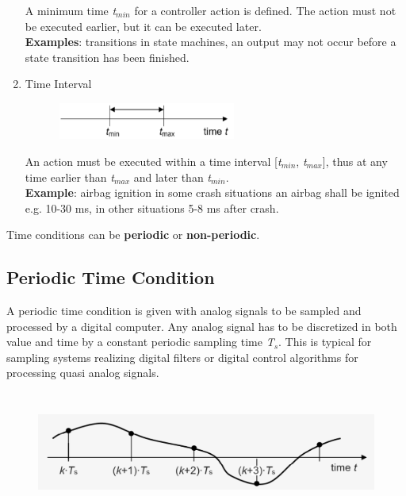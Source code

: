 \begin{enumerate}
A minimum time \textit{t}${}_{min}$ for a controller action is defined. The action must not be executed earlier, but it can be executed later. \\
\textbf{Examples}: transitions in state machines, an output may not occur before a state transition has been finished.

\item Time Interval  

	\begin{figure}[h]
    \centering
    \includegraphics[width=6cm, height=1.2cm]{Images/image65.png}
    \label{fig:Fig 11}
    \end{figure}

An action must be executed within a time interval [\textit{t}${}_{min}$, \textit{t}${}_{max}$], thus at any time earlier than \textit{t}${}_{max}$ and later than\textit{ t}${}_{min}$.\\
\textbf{Example}:  airbag ignition in some crash situations an airbag shall be ignited e.g. 10-30 ms, in other situations 5-8 ms after crash.
\end{enumerate}

Time conditions can be \textbf{periodic} or \textbf{non-periodic}. 

\subsection{Periodic Time Condition}

A periodic time condition is given with analog signals to be sampled and processed by a digital computer. Any analog signal has to be discretized in both value and time by a constant periodic sampling time \textit{T}${}_{s}$. This is typical for sampling systems realizing digital filters or digital control algorithms for processing quasi analog signals.

	\begin{figure}[h]
    \centering
    \includegraphics[width=12cm, height=4cm]{Images/image66.png}
    \label{fig:Fig 12}
    \end{figure}

